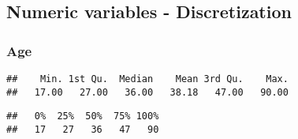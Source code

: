 \documentclass[12pt,]{article}
\newenvironment{Shaded}{\begin{snugshade}}{\end{snugshade}}
\newcommand{\CommentTok}[1]{\textcolor[rgb]{0.56,0.35,0.01}{\textit{#1}}}
\newcommand{\KeywordTok}[1]{\textcolor[rgb]{0.13,0.29,0.53}{\textbf{#1}}}
\newcommand{\NormalTok}[1]{#1}
\newcommand{\OperatorTok}[1]{\textcolor[rgb]{0.81,0.36,0.00}{\textbf{#1}}}
\begin{document}
\hypertarget{numeric-variables---discretization}{%
\subsection{Numeric variables -
Discretization}\label{numeric-variables---discretization}}

\hypertarget{age}{%
\subsubsection{Age}\label{age}}

\begin{Shaded}
\end{Shaded}

\begin{verbatim}
##    Min. 1st Qu.  Median    Mean 3rd Qu.    Max. 
##   17.00   27.00   36.00   38.18   47.00   90.00
\end{verbatim}

\begin{Shaded}
\end{Shaded}

\begin{verbatim}
##   0%  25%  50%  75% 100% 
##   17   27   36   47   90
\end{verbatim}

\begin{Shaded}
\end{Shaded}
\end{document}
